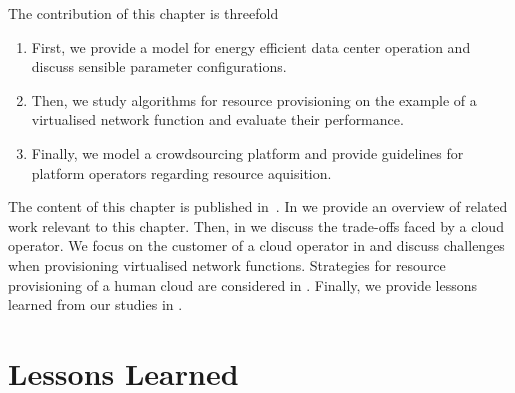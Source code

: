 The contribution of this chapter is threefold
\begin{enumerate}
\item First, we provide a model for energy efficient data center operation and discuss sensible parameter configurations. 
\item Then, we study algorithms for resource provisioning on the example of a virtualised network function and evaluate their performance.
\item Finally, we model a crowdsourcing platform and provide guidelines for platform operators regarding resource aquisition.
\end{enumerate}

The content of this chapter is published in~\cite{Schwartz2012a,Metzger2014a,Schwartz2015}.
In  we provide an overview of related work relevant to this chapter.
Then, in  we discuss the trade-offs faced by a cloud operator.
We focus on the customer of a cloud operator in  and discuss challenges when provisioning virtualised network functions.
Strategies for resource provisioning of a human cloud are considered in .
Finally, we provide lessons learned from our studies in .






\section{Lessons Learned}